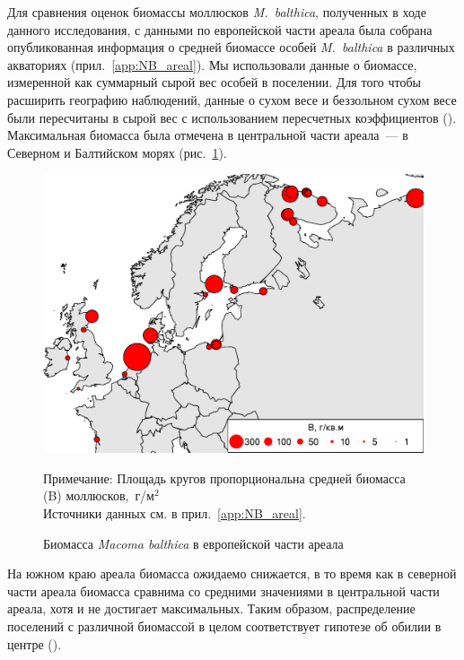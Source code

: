 Для сравнения оценок биомассы моллюсков {\it M.~balthica}, полученных в ходе данного исследования, с данными по европейской части ареала была собрана опубликованная информация о средней биомассе особей {\it M.~balthica} в различных акваториях (прил.~\ref{app:NB_areal}).
Мы использовали данные о биомассе, измеренной как суммарный сырой вес особей в поселении.
Для того чтобы расширить географию наблюдений, данные о сухом весе и беззольном сухом весе были пересчитаны в сырой вес с использованием пересчетных коэффициентов (\cite{Ricciardi_Bourget_1998}).
Максимальная биомасса была отмечена в центральной части ареала~--- в Северном и Балтийском морях (рис.~\ref{ris:B_macrodistribution}).
	\begin{figure}[p]
    \includegraphics[width=\textwidth]{../macrodistribution/Bmean_ru1.pdf}
    \caption{Биомасса {\it Macoma balthica} в европейской части ареала}

{\footnotesize Примечание: Площадь кругов пропорциональна средней биомасса (B) моллюсков,~г/м$^2$ \\
Источники данных см. в прил.~\ref{app:NB_areal}.}
    \label{ris:B_macrodistribution}
	\end{figure}
На южном краю ареала биомасса ожидаемо снижается, в то время как в северной части ареала биомасса сравнима со средними значениями в центральной части ареала, хотя и не достигает максимальных.
Таким образом, распределение поселений с различной биомассой в целом соответствует гипотезе об обилии в центре (\cite{Sagarin_Gaines_2002}).


\afterpage{\clearpage}


